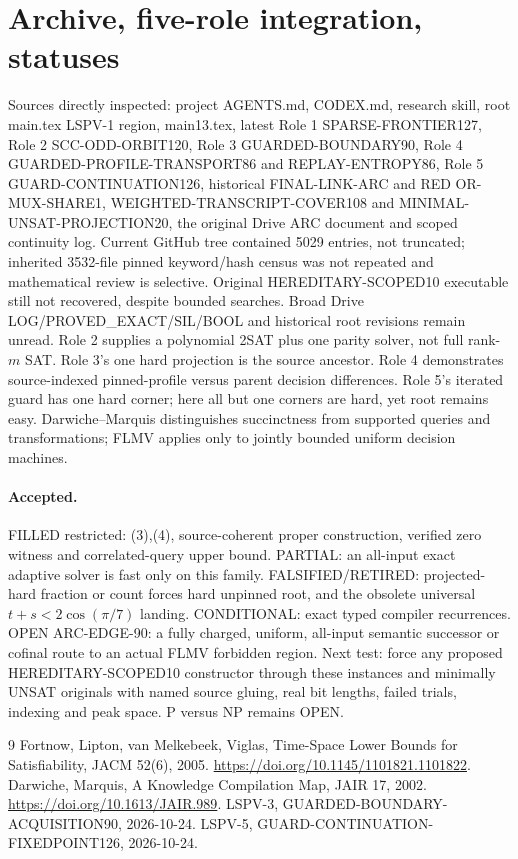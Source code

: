 \documentclass[11pt]{article}
\begin{document}
\section{Archive, five-role integration, statuses}
Sources directly inspected: project AGENTS.md, CODEX.md, research skill, root main.tex LSPV-1 region, main13.tex, latest Role 1 SPARSE-FRONTIER127, Role 2 SCC-ODD-ORBIT120, Role 3 GUARDED-BOUNDARY90, Role 4 GUARDED-PROFILE-TRANSPORT86 and REPLAY-ENTROPY86, Role 5 GUARD-CONTINUATION126, historical FINAL-LINK-ARC and RED OR-MUX-SHARE1, WEIGHTED-TRANSCRIPT-COVER108 and MINIMAL-UNSAT-PROJECTION20, the original Drive ARC document and scoped continuity log. Current GitHub tree contained 5029 entries, not truncated; inherited 3532-file pinned keyword/hash census was not repeated and mathematical review is selective. Original HEREDITARY-SCOPED10 executable still not recovered, despite bounded searches. Broad Drive LOG/PROVED_EXACT/SIL/BOOL and historical root revisions remain unread.
Role 2 supplies a polynomial 2SAT plus one parity solver, not full rank-$m$ SAT. Role 3's one hard projection is the source ancestor. Role 4 demonstrates source-indexed pinned-profile versus parent decision differences. Role 5's iterated guard has one hard corner; here all but one corners are hard, yet root remains easy. Darwiche--Marquis distinguishes succinctness from supported queries and transformations; FLMV applies only to jointly bounded uniform decision machines.
\paragraph{Accepted.} FILLED restricted: (3),(4), source-coherent proper construction, verified zero witness and correlated-query upper bound. PARTIAL: an all-input exact adaptive solver is fast only on this family. FALSIFIED/RETIRED: projected-hard fraction or count forces hard unpinned root, and the obsolete universal $t+s<2\cos(\pi/7)$ landing. CONDITIONAL: exact typed compiler recurrences. OPEN ARC-EDGE-90: a fully charged, uniform, all-input semantic successor or cofinal route to an actual FLMV forbidden region. Next test: force any proposed HEREDITARY-SCOPED10 constructor through these instances and minimally UNSAT originals with named source gluing, real bit lengths, failed trials, indexing and peak space. P versus NP remains OPEN.
\begin{thebibliography}{9}
 Fortnow, Lipton, van Melkebeek, Viglas, Time-Space Lower Bounds for Satisfiability, JACM 52(6), 2005. \url{https://doi.org/10.1145/1101821.1101822}.
 Darwiche, Marquis, A Knowledge Compilation Map, JAIR 17, 2002. \url{https://doi.org/10.1613/JAIR.989}.
 LSPV-3, GUARDED-BOUNDARY-ACQUISITION90, 2026-10-24.
 LSPV-5, GUARD-CONTINUATION-FIXEDPOINT126, 2026-10-24.
\end{thebibliography}
\end{document}
